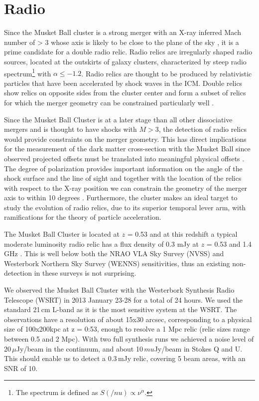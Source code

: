 \section{Radio}

Since the Musket Ball cluster is a strong merger with an X-ray inferred Mach number of > 3 whose axis is likely to be close to the plane of the sky \citep{Dawson:2012ub}, it is a prime candidate for a double radio relic. 
Radio relics are irregularly shaped radio sources, located at the outskirts of galaxy clusters, characterized by steep radio spectrum\footnote{The spectrum is defined as $S(/nu)\propto\nu^\alpha$.} with $\alpha\leq -1.2$.
Radio relics are thought to be produced by relativistic particles that have been accelerated by shock waves in the ICM.
Double relics show relics on opposite sides from the cluster center and form a subset of relics for which the merger geometry can be constrained particularly well \citep[see e.g.][]{Bonafede:2012fu}.

Since the Musket Ball Cluster is at a later stage than all other dissociative
mergers \citep{Dawson:2012dl} and is thought to have shocks with $M >
3$, the detection of radio relics would provide constraints on the merger geometry. 
This has direct implications for the measurement of the dark matter cross-section with the Musket Ball since observed projected offsets must be translated into meaningful physical offsets \citep[see e.g.][]{Dawson:2012ub}. 
The degree of polarization provides important information on the angle of the shock surface and the line of sight and together with the location of the relics with respect to the X-ray position we can constrain the geometry of the merger axis to within 10 degrees \citep{vanWeeren:2011cd}. 
Furthermore, the cluster makes an ideal target to study the evolution of radio relics, due to its superior temporal lever arm, with ramifications for the theory of particle acceleration. 

The Musket Ball Cluster is located at $z$ = 0.53 and at this redshift a typical moderate luminosity radio relic has a flux density of 0.3 mJy at $z$ = 0.53 and 1.4 GHz \citep{Nuza:2012fu, vanWeeren:2011cd}. 
This is well below both the NRAO VLA Sky Survey (NVSS) and Westerbork Northern Sky Survey (WENNS) sensitivities, thus an existing non-detection in these surveys is not surprising. 

We observed the Musket Ball Cluster with the Westerbork Synthesis Radio Telescope (WSRT) in 2013 January 23-28 for a total of 24 hours.  We used the standard 21\,cm L-band as it is the most sensitive system at the WSRT.
The observations have a resolution of about 15x30 arcsec, corresponding to a physical size of 100x200kpc at z = 0:53, enough to resolve a 1 Mpc relic (relic sizes range between 0.5 and 2 Mpc).
With two full synthesis runs we achieved a noise level of 20\,$\mu$Jy/beam in the continuum, and about 10\,$mu$Jy/beam in Stokes Q and U. 
This should enable us to detect a 0.3\,mJy relic, covering 5 beam areas, with
an SNR of 10. 

